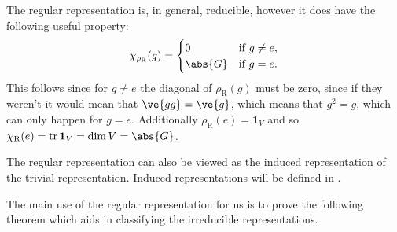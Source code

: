 \documentclass[fleqn]{NotesClass}
\newcommand*{\ident}{\mathbf{1}}
\DeclareMathOperator{\tr}{tr}
\begin{document}
    The regular representation is, in general, reducible, however it does have the following useful property:
    \begin{equation}
        \chi_{\rho_{\mathrm{R}}}(g) = 
        \begin{cases}
            0 & \text{if } g \ne e,\\
            \abs{G} & \text{if } g = e.
        \end{cases}
    \end{equation}
    This follows since for \(g \ne e\) the diagonal of \(\rho_{\mathrm{R}}(g)\) must be zero, since if they weren't it would mean that \(\ve{gg} = \ve{g}\), which means that \(g^2 = g\), which can only happen for \(g = e\).
    Additionally \(\rho_{\mathrm{R}}(e) = \ident_{V}\) and so \(\chi_{\mathrm{R}}(e) = \tr\ident_V = \dim V = \abs{G}\).
    
    The regular representation can also be viewed as the induced representation of the trivial representation.
    Induced representations will be defined in . %
    
    The main use of the regular representation for us is to prove the following theorem which aids in classifying the irreducible representations.
    
\end{document}
